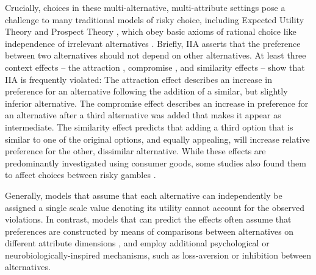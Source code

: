 \documentclass[11pt, a4paper]{article}
\begin{document}
Crucially, choices in these multi-alternative, multi-attribute settings pose a challenge to many traditional models of risky choice, including Expected Utility Theory \parencite[EU][]{vonneumann1947TheoryGamesEconomic} and Prospect Theory \parencite{kahneman1979ProspectTheoryAnalysis,tversky1992AdvancesProspectTheory}, which obey basic axioms of rational choice like independence of irrelevant alternatives \parencite[IIA;][]{luce1959IndividualChoiceBehavior}. Briefly, IIA asserts that the preference between two alternatives should not depend on other alternatives. At least three context effects – the attraction \parencite{huber1982AddingAsymmetricallyDominated}, compromise \parencite{simonson1989ChoiceBasedReasons}, and similarity \parencite{tversky1972EliminationAspectsTheory} effects – show that IIA is frequently violated: The attraction effect describes an increase in preference for an alternative following the addition of a similar, but slightly inferior alternative. The compromise effect describes an increase in preference for an alternative after a third alternative was added that makes it appear as intermediate. The similarity effect predicts that adding a third option that is similar to one of the original options, and equally appealing, will increase relative preference for the other, dissimilar alternative. While these effects are predominantly investigated using consumer goods, some studies also found them to affect choices between risky gambles \parencite{huber1982AddingAsymmetricallyDominated,mohr2017AttractionEffectRisky,soltani2012RangeNormalizationModelContextDependent,tversky1972EliminationAspectsTheory,wedell1991DistinguishingModelsContextually}.

Generally, models that assume that each alternative can independently be assigned a single scale value denoting its utility \parencite[fixed utility or simple scalability models;][]{rieskamp2006ExtendingBoundsRationality} cannot account for the observed violations. In contrast, models that can predict the effects often assume that preferences are constructed by means of comparisons between alternatives on different attribute dimensions \parencite{roe2001MultialternativeDecisionField,trueblood2014MultiattributeLinearBallistic,tversky1972EliminationAspectsTheory,usher2004LossAversionInhibition,tversky1993ContextDependentPreferences}, and employ additional psychological or neurobiologically-inspired mechanisms, such as loss-aversion or inhibition between alternatives.
\end{document}
